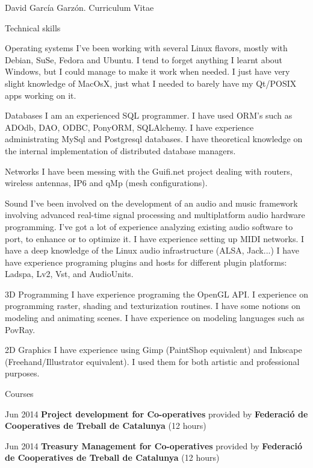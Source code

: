 \documentclass{article}
\begin{document}
\begin{cv}{David García Garzón. Curriculum Vitae}
\begin{cvlist}{Technical skills}
\item[Operating systems]
	I've been working with several Linux flavors, mostly with Debian, SuSe, Fedora and Ubuntu.
I tend to forget anything I learnt about Windows, but I could manage to make it work when needed.
I just have very slight knowledge of MacOsX, just what I needed to barely have my Qt/POSIX apps working on it.


\item[Databases]
	I am an experienced SQL programmer.
I have used ORM's such as ADOdb, DAO, ODBC, PonyORM, SQLAlchemy.
I have experience administrating MySql and Postgresql databases.
I have theoretical knowledge on the internal implementation of distributed database managers.


\item[Networks]
	I have been messing with the Guifi.net project dealing with routers, wireless antennas, IP6 and qMp (mesh configurations).


\item[Sound]
	I've been involved on the development of an audio and music framework
involving advanced real-time signal processing and
multiplatform audio hardware programming.
I've got a lot of experience analyzing existing audio software to port, to enhance or to optimize it.
I have experience setting up MIDI networks.
I have a deep knowledge of the Linux audio infrastructure (ALSA, Jack...)
I have have experience programing plugins and hosts for different plugin platforms: Ladspa, Lv2, Vst, and AudioUnits.


\item[3D Programming]
	I have experience programing the OpenGL API.
I experience on programming raster, shading and texturization routines.
I have some notions on modeling and animating scenes.
I have experience on modeling languages such as PovRay.


\item[2D Graphics]
	I have experience using Gimp (PaintShop equivalent) and Inkscape (Freehand/Illustrator equivalent).
I used them for both artistic and professional purposes.


\end{cvlist}

\begin{cvlist}{Courses}

\item[Jun 2014]
	{\bf Project development for Co-operatives } provided by {\bf Federació de Cooperatives de Treball de Catalunya} (12 hours)

\item[Jun 2014]
	{\bf Treasury Management for Co-operatives } provided by {\bf Federació de Cooperatives de Treball de Catalunya} (12 hours)


\end{cvlist}
\end{cv}
\end{document}
